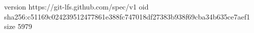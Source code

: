 version https://git-lfs.github.com/spec/v1
oid sha256:c51169c024239512477861e388fc747018df27383b938f69cba34b635ce7aef1
size 5979
